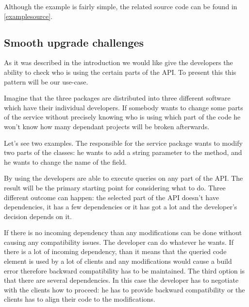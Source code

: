 Although the example is fairly simple, the related source code can be found in
\autoref{examplesource}.

\subsection{Smooth upgrade challenges}
As it was described in the introduction we would like give the developers the
ability to check who is using the certain parts of the API. To present this this
pattern will be our use-case.

Imagine that the three packages are distributed into three different software
which have their individual developers. If somebody wants to change some parts
of the service without precisely knowing who is using which part of the code he
won't know how many dependant projects will be broken afterwards.

Let's see two examples. The responsible for the service package wants to modify
two parts of the classes: he wants to add a string parameter to the
 method, and he wants to change the name of the
 field. 

By using \ptool{} the developers are able to execute queries on any part of the
API. The result will be the primary starting point for considering what to do.
Three different outcome can happen: the selected part of the API doesn't have
dependencies, it has a few dependencies or it has got a lot and the developer's
decision depends on it. 

If there is no incoming dependency than any modifications can be done without
causing any compatibility issues. The developer can do whatever he wants.
If there is a lot of incoming dependency, than it means that the queried code
element is used by a lot of clients and any modifications would cause a build
error therefore backward compatibility has to be maintained. The third option is
that there are several dependencies. In this case the developer has to negotiate
with the clients how to proceed: he has to provide backward compatibility or the
clients has to align their code to the modifications.

